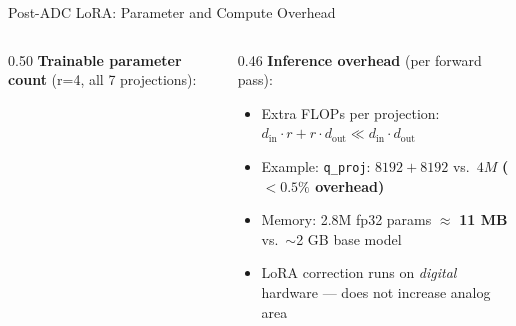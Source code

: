 \begin{frame}[shrink=20]{Post-ADC LoRA: Parameter and Compute Overhead}
  \begin{columns}[T]
    \begin{column}{0.50\textwidth}
      \textbf{Trainable parameter count} (r=4, all 7 projections):
      \begin{center}
      \renewcommand{\arraystretch}{1.2}
      \end{center}
    \end{column}
    \begin{column}{0.46\textwidth}
      \textbf{Inference overhead} (per forward pass):
      \begin{itemize}
        \item Extra FLOPs per projection:
              $d_\mathrm{in}{\cdot}r + r{\cdot}d_\mathrm{out} \ll d_\mathrm{in}{\cdot}d_\mathrm{out}$
        \item Example: \texttt{q\_proj}: $8192{+}8192$ vs.\ $4M$
              \textbf{($<\!0.5\%$ overhead)}
        \item Memory: 2.8M fp32 params $\approx$ \textbf{11 MB}
              vs.\ $\sim$2 GB base model
        \item LoRA correction runs on \emph{digital} hardware
              — does not increase analog area
      \end{itemize}


\end{column}
\end{columns}
\end{frame}
